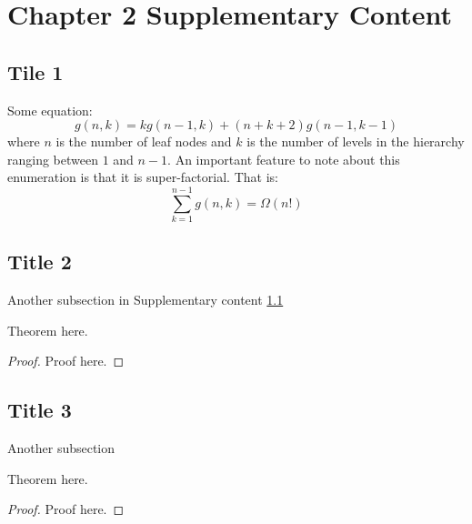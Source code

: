 \chapter{Chapter 2 Supplementary Content}\label{app:suppcontent}

\section{Tile 1}\label{app:Chapter2}
Some equation:
\begin{equation}
g(n,k) = kg(n-1,k)+(n+k+2)g(n-1,k-1)
\end{equation}
where $n$ is the number of leaf nodes and $k$ is the number of levels in the hierarchy ranging between $1$ and $n-1$. An important feature to note about this enumeration is that it is super-factorial. That is:
\begin{equation}
\sum_{k=1}^{n-1} g(n,k) = \Omega (n!)
\end{equation}

\section{Title 2}\label{app:Chapter3}

Another subsection in Supplementary content \ref{app:Chapter2}

\begin{theorem}
Theorem here.
\end{theorem}

\begin{proof}
    Proof here.
\end{proof}

\section{Title 3}\label{app:Chapter4}

Another subsection

\begin{theorem}
Theorem here.
\end{theorem}

\begin{proof}
    Proof here.
\end{proof}